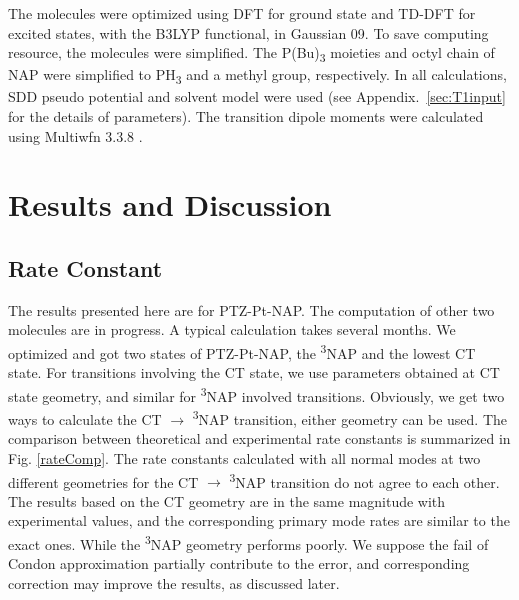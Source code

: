 The molecules were optimized using DFT for ground state and TD-DFT for excited states, with the B3LYP functional, in Gaussian 09. To save computing resource, the molecules were simplified. The P(Bu)\textsubscript{3} moieties and octyl chain of NAP were simplified to PH\textsubscript{3} and a methyl group, respectively. In all calculations, SDD pseudo potential and solvent model were used (see Appendix.~\ref{sec:T1input} for the details of parameters). The transition dipole moments were calculated using Multiwfn 3.3.8 \cite{lu2012multiwfn}.




\section{Results and Discussion} %

\subsection{Rate Constant}
The results presented here are for PTZ-Pt-NAP. The computation of other two molecules are in progress. A typical calculation takes several months. We optimized and got two states of PTZ-Pt-NAP, the \textsuperscript{3}NAP and the lowest CT state. For transitions involving the CT state, we use parameters obtained at CT state geometry, and similar for \textsuperscript{3}NAP involved transitions. Obviously, we get two ways to calculate the CT $\rightarrow$ \textsuperscript{3}NAP transition, either geometry can be used. The comparison between theoretical and experimental rate constants is summarized in Fig. \ref{rateComp}. The rate constants calculated with all normal modes at two different geometries for the CT $\rightarrow$ \textsuperscript{3}NAP transition do not agree to each other. The results based on the CT geometry are in the same magnitude with experimental values, and the corresponding primary mode rates are similar to the exact ones. While the \textsuperscript{3}NAP geometry performs poorly. We suppose the fail of Condon approximation partially contribute to the error, and corresponding correction may improve the results, as discussed later.

